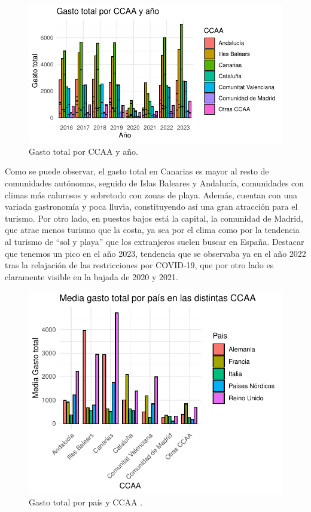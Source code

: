 \documentclass[data,article,submit,moreauthors,pdftex]{Definitions/mdpi}
\begin{document}
\begin{figure}[H]
\includegraphics{ProyectoAED2024_Rmd_files/figure-latex/unnamed-chunk-22-1} \caption{Gasto total por CCAA y año.\label{fig:GastototalporCCAAyaño}}\label{fig:unnamed-chunk-22}
\end{figure}

Como se puede observar, el gasto total en Canarias es mayor al resto de
comunidades autónomas, seguido de Islas Baleares y Andalucía,
comunidades con climas más calurosos y sobretodo con zonas de playa.
Además, cuentan con una variada gastronomía y poca lluvia, constituyendo
así una gran atracción para el turismo. Por otro lado, en puestos bajos
está la capital, la comunidad de Madrid, que atrae menos turismo que la
costa, ya sea por el clima como por la tendencia al turismo de ``sol y
playa'' que los extranjeros suelen buscar en España. Destacar que
tenemos un pico en el año 2023, tendencia que se observaba ya en el año
2022 tras la relajación de las restricciones por COVID-19, que por otro
lado es claramente visible en la bajada de 2020 y 2021.

\begin{figure}[H]
\includegraphics{ProyectoAED2024_Rmd_files/figure-latex/unnamed-chunk-23-1} \caption{Gasto total por país y CCAA .\label{fig:GastototalporpaísyCCAA}}\label{fig:unnamed-chunk-23}
\end{figure}
\end{document}
